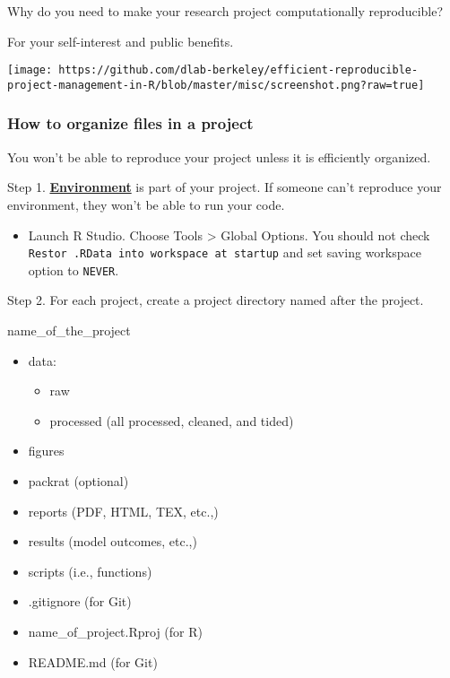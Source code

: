 \documentclass[
]{book}
\providecommand{\tightlist}{%
  \setlength{\itemsep}{0pt}\setlength{\parskip}{0pt}}
\begin{document}
Why do you need to make your research project computationally reproducible?

For your self-interest and public benefits.

\texttt{[image: https://github.com/dlab-berkeley/efficient-reproducible-project-management-in-R/blob/master/misc/screenshot.png?raw=true]}

\hypertarget{how-to-organize-files-in-a-project}{%
\subsubsection{How to organize files in a project}\label{how-to-organize-files-in-a-project}}

You won't be able to reproduce your project unless it is efficiently organized.

Step 1. \href{https://environments.rstudio.com/}{\textbf{Environment}} is part of your project. If someone can't reproduce your environment, they won't be able to run your code.

\begin{itemize}
\tightlist
\item
  Launch R Studio. Choose Tools \textgreater{} Global Options. You should not check \texttt{Restor\ .RData\ into\ workspace\ at\ startup} and set saving workspace option to \texttt{NEVER}.
\end{itemize}

Step 2. For each project, create a project directory named after the project.

name\_of\_the\_project

\begin{itemize}
\tightlist
\item
  data:

  \begin{itemize}
  \tightlist
  \item
    raw
  \item
    processed (all processed, cleaned, and tided)
  \end{itemize}
\item
  figures
\item
  packrat (optional)
\item
  reports (PDF, HTML, TEX, etc.,)
\item
  results (model outcomes, etc.,)
\item
  scripts (i.e., functions)
\item
  .gitignore (for Git)
\item
  name\_of\_project.Rproj (for R)
\item
  README.md (for Git)
\end{itemize}
\end{document}
